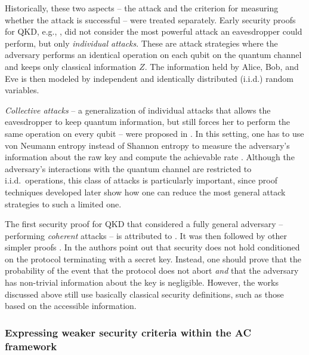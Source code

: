 Historically, these two aspects \--- the attack and the criterion for
measuring whether the attack is successful \--- were treated
separately. Early security proofs for QKD, e.g., \textcite{BBBSS92},
did not consider the most powerful attack an eavesdropper could
perform, but only \emph{individual attacks}. These are attack
strategies where the adversary performs an identical operation on each
qubit on the quantum channel and keeps only classical information
$Z$. The information held by Alice, Bob, and Eve is then modeled by
independent and identically distributed (i.i.d.) random variables.

\emph{Collective attacks} \--- a generalization of individual attacks
that allows the eavesdropper to keep quantum information, but still
forces her to perform the same operation on every qubit \--- were
proposed in \textcite{BM97b,BBBvdGM02}. In this setting, one has to
use von Neumann entropy instead of Shannon entropy to measure the
adversary's information about the raw key and compute the achievable
rate \cite{DW05}. Although the adversary's interactions with the
quantum channel are restricted to i.i.d.\ operations, this class of
attacks is particularly important, since proof techniques developed
later \cite{Ren05,Ren07,CKR09,DFR20,AFRV19} show how one can reduce the most
general attack strategies to such a limited one.

The first security proof for QKD that considered a fully general adversary \--- performing \emph{coherent} attacks \--- is attributed to \textcite{May96,May01}. It was then followed by other simpler proofs \cite{BBBMR00,BBBMR06,SP00}. 
In \textcite{BBBMR00,BBBMR06,SP00} the authors point out that security does not hold conditioned on the protocol terminating with a secret key. Instead, one should prove that the probability of the event that the protocol does not abort  \emph{and} that the adversary has non-trivial information about the key is negligible. However, the works discussed above still use basically classical security definitions, such as those based on the accessible information.
 
\subsubsection{Expressing weaker security criteria within the AC framework}
\label{sec:qkd.other.ac}

